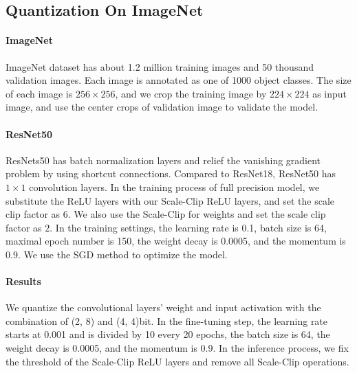 \documentclass[letterpaper]{article} %
\begin{document}
\subsection{Quantization On ImageNet}
\paragraph{ImageNet} 
ImageNet dataset has about 1.2 million training images and 50 thousand validation images. 
Each image is annotated as one of 1000 object classes.
The size of each image is $256\times 256$, and we crop the training image by $224\times 224$ as input image,
and use the center crops of validation image to validate the model.
\paragraph{ResNet50}
ResNets50 has batch normalization layers and relief the vanishing gradient problem by using shortcut connections.
Compared to ResNet18, ResNet50 has $1\times1$ convolution layers.
In the training process of full precision model, 
we substitute the ReLU layers with our Scale-Clip ReLU layers, and set the scale clip factor as $6$.
We also use the Scale-Clip for weights and set the scale clip factor as $2$.
In the training settings, the learning rate is 0.1, batch size is 64, maximal epoch number is 150,
the weight decay is 0.0005, and the momentum is 0.9.
We use the SGD method to optimize the model.
\paragraph{Results}
We quantize the convolutional layers' weight and input activation with the combination of (2, 8) and (4, 4)bit.
In the fine-tuning step, the learning rate starts at 0.001 and is divided by 10 every 20 epochs, 
the batch size is 64, the weight decay is 0.0005, and the momentum is 0.9.
In the inference process, we fix the threshold of the Scale-Clip ReLU layers and remove all Scale-Clip operations.
\end{document}
